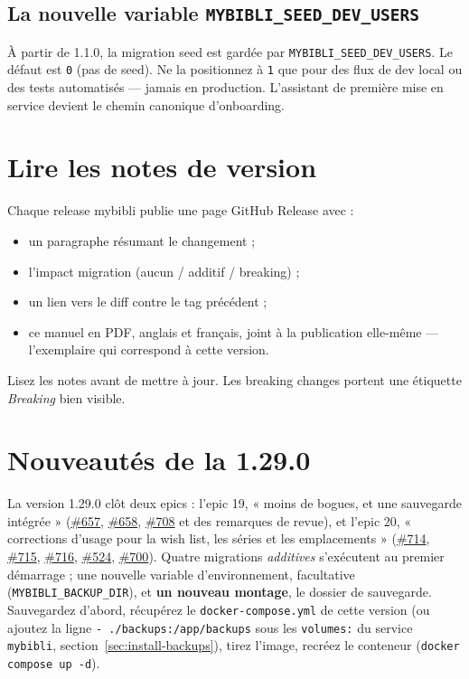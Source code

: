 \subsection*{La nouvelle variable \texttt{MYBIBLI\_SEED\_DEV\_USERS}}

À partir de 1.1.0, la migration seed est gardée par
\texttt{MYBIBLI\_SEED\_DEV\_USERS}.
Le défaut est \texttt{0} (pas de seed). Ne la positionnez à
\texttt{1} que pour des flux de dev local ou des tests automatisés
— jamais en production. L'assistant de première mise en service
devient le chemin canonique d'onboarding.

\section{Lire les notes de version}

Chaque release mybibli publie une page GitHub Release avec :

\begin{itemize}
  \item un paragraphe résumant le changement ;
  \item l'impact migration (aucun / additif / breaking) ;
  \item un lien vers le diff contre le tag précédent ;
  \item ce manuel en PDF, anglais et français, joint à la publication
        elle-même --- l'exemplaire qui correspond à cette version.
\end{itemize}

Lisez les notes avant de mettre à jour. Les breaking changes
portent une étiquette \emph{Breaking} bien visible.

\section{Nouveautés de la 1.29.0}\label{sec:whats-new-1.29.0}

La version 1.29.0 clôt deux epics : l'epic 19, « moins de bogues, et
une sauvegarde intégrée »
(\href{https://github.com/guycorbaz/mybibli/issues/657}{\#657},
\href{https://github.com/guycorbaz/mybibli/issues/658}{\#658},
\href{https://github.com/guycorbaz/mybibli/issues/708}{\#708} et des
remarques de revue), et l'epic 20, « corrections d'usage pour la wish list, les séries et les emplacements »
(\href{https://github.com/guycorbaz/mybibli/issues/714}{\#714},
\href{https://github.com/guycorbaz/mybibli/issues/715}{\#715},
\href{https://github.com/guycorbaz/mybibli/issues/716}{\#716},
\href{https://github.com/guycorbaz/mybibli/issues/524}{\#524},
\href{https://github.com/guycorbaz/mybibli/issues/700}{\#700}).
Quatre migrations \emph{additives} s'exécutent au premier démarrage ;
une nouvelle variable d'environnement, facultative
(\texttt{MYBIBLI\_BACKUP\_DIR}), et \textbf{un nouveau montage}, le
dossier de sauvegarde. Sauvegardez d'abord, récupérez le
\texttt{docker-compose.yml} de cette version (ou ajoutez la ligne
\texttt{- ./backups:/app/backups} sous les \texttt{volumes:} du service
\texttt{mybibli}, section~\ref{sec:install-backups}), tirez l'image,
recréez le conteneur (\texttt{docker compose up -d}).

